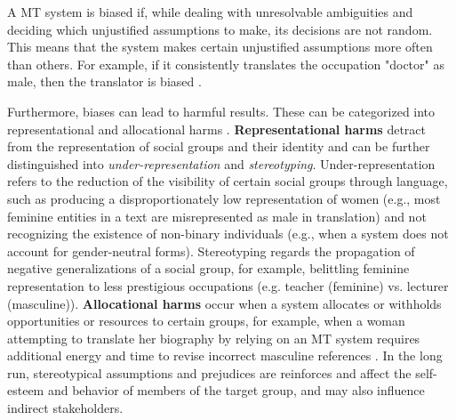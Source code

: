 A MT system is biased if, while dealing with unresolvable ambiguities and deciding which unjustified assumptions to make, its decisions are not random. This means that the system makes certain unjustified assumptions more often than others. For example, if it consistently translates the occupation "doctor" as male, then the translator is biased \parencite{bias_taxonomy}.

Furthermore, biases can lead to harmful results. These can be categorized into representational and allocational harms \parencite{Savoldi_2021}. \textbf{Representational harms} detract from the representation of social groups and their identity and can be further distinguished into \textit{under-representation} and \textit{stereotyping}. Under-representation refers to the reduction of the visibility of certain social groups through language, such as producing a disproportionately low representation of women (e.g., most feminine entities in a text are misrepresented as male in translation) and not recognizing the existence of non-binary individuals (e.g., when a system does not account for gender-neutral forms). Stereotyping regards the propagation of negative generalizations of a social group, for example, belittling feminine representation to less prestigious occupations (e.g. teacher (feminine) vs. lecturer (masculine)). \textbf{Allocational harms} occur when a system allocates or withholds opportunities or resources to certain groups, for example, when a woman attempting to translate her biography by relying on an MT system requires additional energy and time to revise incorrect masculine references \parencite{Savoldi_2021}. In the long run, stereotypical assumptions and prejudices are reinforces and affect the self-esteem and behavior of members of the target group, and may also influence indirect stakeholders. 

